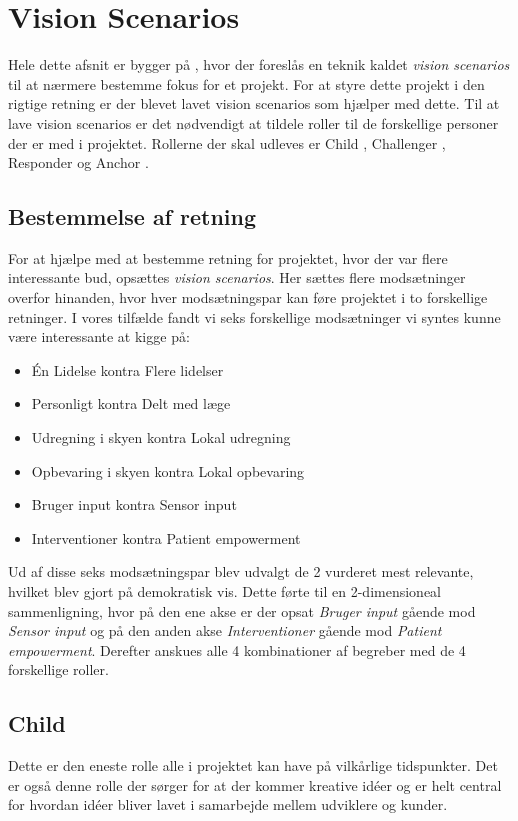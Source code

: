 \section{Vision Scenarios}
Hele dette afsnit er bygger på \citet[Sektion 17.1]{art:essence}, hvor der foreslås en teknik kaldet \textit{vision scenarios} til at nærmere bestemme fokus for et projekt.
For at styre dette projekt i den rigtige retning er der blevet lavet vision scenarios som hjælper med dette.
Til at lave vision scenarios er det nødvendigt at tildele roller til de forskellige personer der er med i projektet.
Rollerne der skal udleves er Child \citep[Kapitel 18]{art:essence}, Challenger \citep[Kapitel 19]{art:essence}, Responder \citep[Kapitel 20]{art:essence} og Anchor \citep[Kapitel 21]{art:essence}.

\subsection{Bestemmelse af retning}
For at hjælpe med at bestemme retning for projektet, hvor der var flere interessante bud, opsættes \textit{vision scenarios}.
Her sættes flere modsætninger overfor hinanden, hvor hver modsætningspar kan føre projektet i to forskellige retninger.
I vores tilfælde fandt vi seks forskellige modsætninger vi syntes kunne være interessante at kigge på:
\begin{itemize}
	\item Én Lidelse kontra Flere lidelser
	\item Personligt kontra Delt med læge
	\item Udregning i skyen kontra Lokal udregning
	\item Opbevaring i skyen kontra Lokal opbevaring
	\item Bruger input kontra Sensor input
	\item Interventioner kontra Patient empowerment
\end{itemize}

Ud af disse seks modsætningspar blev udvalgt de 2 vurderet mest relevante, hvilket blev gjort på demokratisk vis.
Dette førte til en 2-dimensioneal sammenligning, hvor på den ene akse er der opsat \textit{Bruger input} gående mod \textit{Sensor input} og på den anden akse \textit{Interventioner} gående mod \textit{Patient empowerment}.
Derefter anskues alle 4 kombinationer af begreber med de 4 forskellige roller.

\subsection{Child}
Dette er den eneste rolle alle i projektet kan have på vilkårlige tidspunkter.
Det er også denne rolle der sørger for at der kommer kreative idéer og er helt central for hvordan idéer bliver lavet i samarbejde mellem udviklere og kunder.

